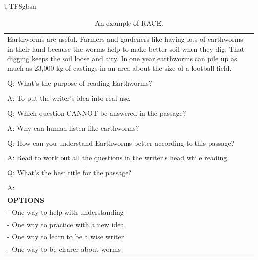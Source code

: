 \documentclass[11pt, a4paper, logo, copyright, nonumbering]{deepseek}
\begin{document}
\begin{CJK*}{UTF8}{gbsn}
\begin{table}[h]
\begin{tabular}{p{14cm}}
Earthworms are useful. Farmers and gardeners like having lots of earthworms in their land because the worms help to make better soil when they dig. That digging keeps the soil loose and airy. In one year earthworms can pile up as much as 23,000 kg of castings in an area about the size of a football field.\\
\\
Q: What's the purpose of reading Earthworms?\\
\\
A: To put the writer's idea into real use.\\
\\
Q: Which question CANNOT be answered in the passage?\\
\\
A: Why can human listen like earthworms?\\
\\
Q: How can you understand Earthworms better according to this passage?\\
\\
A: Read to work out all the questions in the writer's head while reading.\\
\\
Q: What's the best title for the passage?\\
\\
A:\\
\midrule
\textbf{OPTIONS}\\
- One way to help with understanding\\
- One way to practice with a new idea\\
- One way to learn to be a wise writer\\
- One way to be clearer about worms\\
\bottomrule
\end{tabular}
    \caption{\centering An example of RACE.}
    \label{tab:race_eval_format_example}
\end{table}


\end{CJK*}
\end{document}
